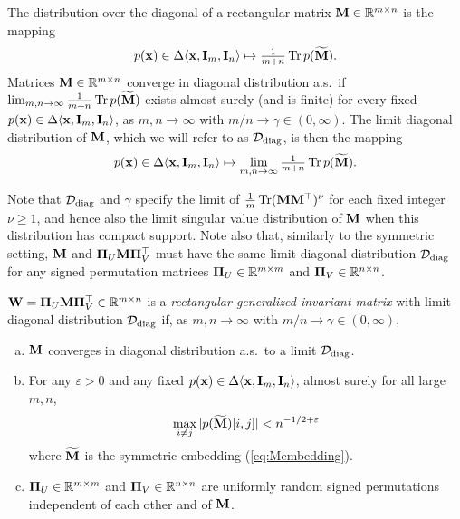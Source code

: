 \documentclass[10pt,reqno]{amsart}
\def\x{\mathbf{x}}
\def\W{\mathbf{W}}
\def\R{\mathbb{R}}
\def\bx{\mathbf{x}}
\def\eps{\varepsilon}
\def\Tr{\operatorname{Tr}}
\newcommand{\tdiag}{\mathrm{diag}}
\begin{document}
\begin{definition}\label{def:rec_diag}
The distribution over the diagonal of a rectangular matrix $\mathbf{M}\in\mathbb{R}^{m\times n}$ 
is the mapping
\begin{align*}
p(\bx) \in \Delta \langle \bx, \bI_m, \bI_n \rangle \mapsto 
\tfrac{1}{m+n} \Tr p(\widetilde\bM).
\end{align*}
Matrices $\bM \in \R^{m \times n}$ converge in diagonal distribution a.s.\ if
$\lim_{m,n \to \infty} \frac{1}{m+n} \Tr p(\widetilde\bM)$ exists almost
surely (and is finite) for every fixed $p(\bx) \in \Delta \langle \x, \bI_m,
\bI_n \rangle$, as $m,n \to \infty$ with $m/n\to\gamma \in (0,\infty)$.
The limit diagonal distribution of $\mathbf{M}$, which we will refer to as
$\cD_\tdiag$, is then the mapping
\begin{align*}
p(\bx) \in \Delta\langle\bx,\bI_m,\bI_n\rangle \mapsto
\lim_{m,n\to\infty} \tfrac{1}{m+n} \Tr p(\widetilde\bM).
\end{align*}
\end{definition}

Note that $\cD_\tdiag$ and $\gamma$ specify the
limit of $\frac{1}{m}\Tr (\bM\bM^\top)^\nu$ for each fixed integer
$\nu \geq 1$, and hence also the limit
singular value distribution of $\mathbf{M}$ when this distribution has compact support.
Note also that, similarly to the symmetric setting, $\mathbf{M}$ and
$\bm{\Pi}_U \mathbf{M}\bm{\Pi}_V^\top$ must have the same limit diagonal distribution
$\cD_{\tdiag}$ for any signed permutation matrices
$\bPi_U \in \R^{m \times m}$ and $\bPi_V \in \R^{n \times n}$.

\begin{definition}\label{def:rectinvariant}
$\W=\bPi_U\bM\bPi_V^\top \in \R^{m \times n}$ is a
\emph{rectangular generalized invariant matrix}
with limit diagonal distribution $\cD_\tdiag$ if,
as $m,n\to\infty$ with $m/n\to\gamma\in(0,\infty)$,
\begin{enumerate}[(a)]
\item $\mathbf{M}$ converges in diagonal distribution a.s.\ to a limit
$\cD_\tdiag$.
\item For any $\eps>0$ and any fixed $p(\bx) \in \Delta\langle \bx,\bI_m,\bI_n \rangle$,
almost surely for all large $m,n$,
\[\max_{i \neq j} |p(\widetilde \bM)[i,j]|<n^{-1/2+\eps}\]
where $\widetilde{\mathbf{M}}$ is the symmetric embedding (\ref{eq:Membedding}).
\item $\bm{\Pi}_U\in\mathbb{R}^{m\times m}$ and $\bm{\Pi}_V\in\mathbb{R}^{n\times n}$ are uniformly
random signed permutations independent of each other and of $\mathbf{M}$.
\end{enumerate}
\end{definition}
\end{document}
